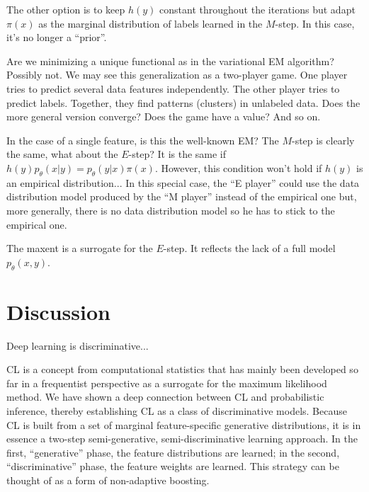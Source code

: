 \documentclass[english]{scrartcl}
\begin{document}
The other option is to keep $h(y)$ constant throughout the iterations but adapt $\pi(x)$ as the marginal distribution of labels learned in the $M$-step. In this case, it's no longer a ``prior''. 

Are we minimizing a unique functional as in the variational EM algorithm? Possibly not. We may see this generalization as a two-player game. One player tries to predict several data features independently. The other player tries to predict labels. Together, they find patterns (clusters) in unlabeled data. Does the more general version converge? Does the game have a value? And so on.

In the case of a single feature, is this the well-known EM? The $M$-step is clearly the same, what about the $E$-step? It is the same if $h(y)p_\theta(x|y)=p_\theta(y|x)\pi(x)$. However, this condition won't hold if $h(y)$ is an empirical distribution... In this special case, the ``E player'' could use the data distribution model produced by the ``M player'' instead of the empirical one but, more generally, there is no data distribution model so he has to stick to the empirical one.

The maxent is a surrogate for the $E$-step. It reflects the lack of a full model $p_\theta(x,y)$.



\section{Discussion}
\label{sec:discussion}

Deep learning is discriminative...

CL is a concept from computational statistics that has mainly been developed so far in a frequentist perspective as a surrogate for the maximum likelihood method. We have shown a deep connection between CL and probabilistic inference, thereby establishing CL as a class of discriminative models. Because CL is built from a set of marginal feature-specific generative distributions, it is in essence a two-step semi-generative, semi-discriminative learning approach. In the first, ``generative'' phase, the feature distributions are learned; in the second, ``discriminative'' phase, the feature weights are learned. This strategy can be thought of as a form of non-adaptive boosting.
\end{document}
